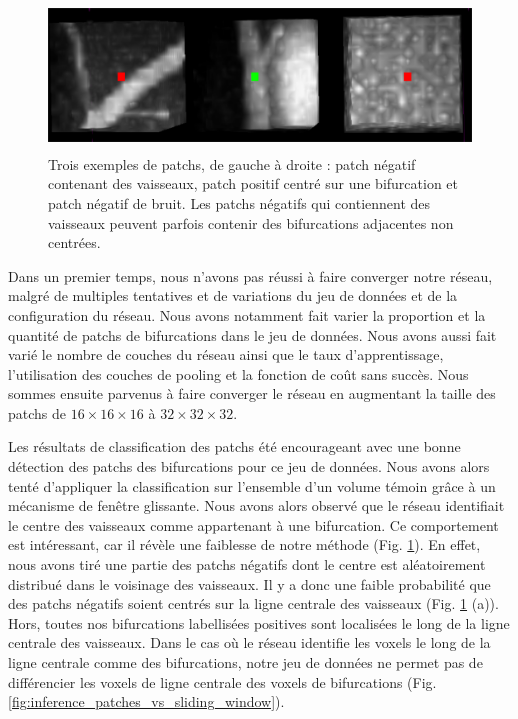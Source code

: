 \begin{figure}[!ht]
    \centering
    \includegraphics[height=4cm]{Images/exp_patchs_exemple.png}
    \caption{Trois exemples de patchs, de gauche à droite : patch négatif contenant des vaisseaux, patch positif centré sur une bifurcation et patch négatif de bruit. Les patchs négatifs qui contiennent des vaisseaux peuvent parfois contenir des bifurcations adjacentes non centrées.}
    \label{fig:exp_patchs}
\end{figure}

Dans un premier temps, nous n'avons pas réussi à faire converger notre réseau, malgré de multiples tentatives et de variations du jeu de données et de la configuration du réseau. Nous avons notamment fait varier la proportion et la quantité de patchs de bifurcations dans le jeu de données. Nous avons aussi fait varié le nombre de couches du réseau ainsi que le taux d'apprentissage, l'utilisation des couches de pooling et la fonction de coût sans succès. Nous sommes ensuite parvenus à faire converger le réseau en augmentant la taille des patchs de  $16 \times 16 \times 16$ à $32 \times 32 \times 32$.

Les résultats de classification des patchs été encourageant avec une bonne détection des patchs des bifurcations pour ce jeu de données. Nous avons alors tenté d'appliquer la classification sur l'ensemble d'un volume témoin grâce à un mécanisme de fenêtre glissante. Nous avons alors observé que le réseau identifiait le centre des vaisseaux comme appartenant à une bifurcation. Ce comportement est intéressant, car il révèle une faiblesse de notre méthode (Fig. \ref{fig:exp_patchs}). En effet, nous avons tiré une partie des patchs négatifs dont le centre est aléatoirement distribué dans le voisinage des vaisseaux. Il y a donc une faible probabilité que des patchs négatifs soient centrés sur la ligne centrale des vaisseaux (Fig. \ref{fig:exp_patchs} (a)). Hors, toutes nos bifurcations labellisées positives sont localisées le long de la ligne centrale des vaisseaux. Dans le cas où le réseau identifie les voxels le long de la ligne centrale comme des bifurcations, notre jeu de données ne permet pas de différencier les voxels de ligne centrale des voxels de bifurcations (Fig. \ref{fig:inference_patches_vs_sliding_window}).

